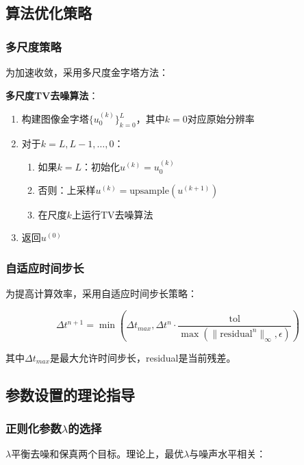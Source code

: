 \documentclass[a4paper,12pt]{ctexart}
\begin{document}
\subsection{算法优化策略}

\subsubsection{多尺度策略}

为加速收敛，采用多尺度金字塔方法：

\textbf{多尺度TV去噪算法}：
\begin{enumerate}
    \item 构建图像金字塔$\{u_0^{(k)}\}_{k=0}^L$，其中$k=0$对应原始分辨率
    \item 对于$k = L, L-1, \ldots, 0$：
    \begin{enumerate}
        \item 如果$k = L$：初始化$u^{(k)} = u_0^{(k)}$
        \item 否则：上采样$u^{(k)} = \text{upsample}(u^{(k+1)})$
        \item 在尺度$k$上运行TV去噪算法
    \end{enumerate}
    \item 返回$u^{(0)}$
\end{enumerate}

\subsubsection{自适应时间步长}

为提高计算效率，采用自适应时间步长策略：

\begin{equation}
\Delta t^{n+1} = \min\left(\Delta t_{max}, \Delta t^n \cdot \frac{\text{tol}}{\max(\|\text{residual}^n\|_\infty, \epsilon)}\right)
\end{equation}

其中$\Delta t_{max}$是最大允许时间步长，residual是当前残差。

\subsection{参数设置的理论指导}

\subsubsection{正则化参数$\lambda$的选择}

$\lambda$平衡去噪和保真两个目标。理论上，最优$\lambda$与噪声水平相关：
\end{document}

